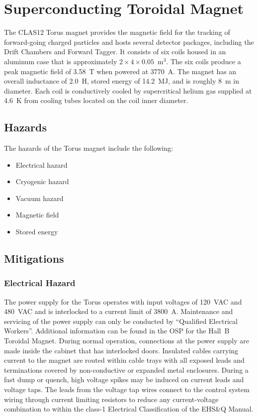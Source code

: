 \section{Superconducting Toroidal Magnet}

The CLAS12 Torus magnet provides the magnetic field for the tracking of forward-going
charged particles and hosts several detector packages, including the Drift Chambers 
and Forward Tagger. It consists of six coils housed in an aluminum case that is 
approximately $2 \times 4 \times 0.05$~m$^3$. The six coils produce a peak magnetic field 
of 3.58~T when powered at 3770~A. The magnet has an overall inductance of 2.0~H, stored 
energy of 14.2~MJ, and is roughly 8~m in diameter. Each coil is conductively cooled by 
supercritical helium gas supplied at 4.6~K from cooling tubes located on the coil inner 
diameter.

\subsection{Hazards} 

The hazards of the Torus magnet include the following:

\begin{itemize}
\item Electrical hazard
\item Cryogenic hazard
\item Vacuum hazard
\item Magnetic field
\item Stored energy
\end{itemize}

\subsection{Mitigations}

\subsubsection{Electrical Hazard}

The power supply for the Torus operates with input voltages of 120~VAC and 480~VAC and is 
interlocked to a current limit of 3800~A. Maintenance and servicing of the power supply can 
only be conducted by ``Qualified Electrical Workers''. Additional information can be found 
in the OSP for the Hall~B Toroidal Magnet. During normal operation, connections at the
power supply are made inside the cabinet that has interlocked doors. Insulated cables 
carrying current to the magnet are routed within cable trays with all exposed leads and 
terminations covered by non-conductive or expanded metal enclosures. During a fast dump or 
quench, high voltage spikes may be induced on current leads and voltage taps. The leads from
the voltage tap wires connect to the control system wiring through current limiting resistors 
to reduce any current-voltage combination to within the class-1 Electrical Classification of 
the EHS\&Q Manual.

